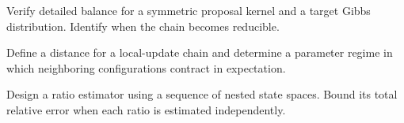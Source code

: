\begin{problem}
Verify detailed balance for a symmetric proposal kernel and a target Gibbs
distribution.  Identify when the chain becomes reducible.
\end{problem}

\begin{problem}
Define a distance for a local-update chain and determine a parameter regime in
which neighboring configurations contract in expectation.
\end{problem}

\begin{problem}
Design a ratio estimator using a sequence of nested state spaces.  Bound its
total relative error when each ratio is estimated independently.
\end{problem}
